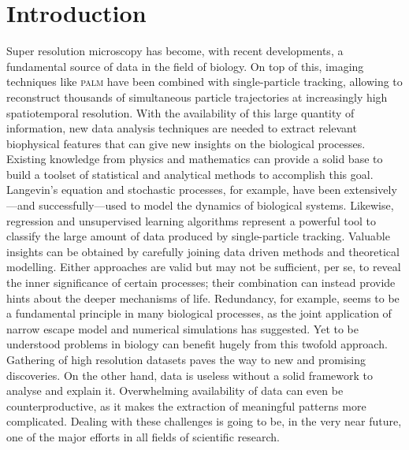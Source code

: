 
\chapter{Introduction}\label{sec:introduction}

Super resolution microscopy has become, with recent developments, a fundamental source of data in the field of biology. On top of this, imaging techniques like \textsc{palm} have been combined with single-particle tracking, allowing to reconstruct thousands of simultaneous particle trajectories at increasingly high spatiotemporal resolution. With the availability of this large quantity of information, new data analysis techniques are needed to extract relevant biophysical features that can give new insights on the biological processes. Existing knowledge from physics and mathematics can provide a solid base to build a toolset of statistical and analytical methods to accomplish this goal. Langevin's equation and stochastic processes, for example, have been extensively---and successfully---used to model the dynamics of biological systems. Likewise, regression and unsupervised learning algorithms represent a powerful tool to classify the large amount of data produced by single-particle tracking. Valuable insights can be obtained by carefully joining data driven methods and theoretical modelling. Either approaches are valid but may not be sufficient, per se, to reveal the inner significance of certain processes; their combination can instead provide hints about the deeper mechanisms of life. Redundancy, for example, seems to be a fundamental principle in many biological processes, as the joint application of narrow escape model and numerical simulations has suggested. Yet to be understood problems in biology can benefit hugely from this twofold approach. Gathering of high resolution datasets paves the way to new and promising discoveries. On the other hand, data is useless without a solid framework to analyse and explain it. Overwhelming availability of data can even be counterproductive, as it makes the extraction of meaningful patterns more complicated. Dealing with these challenges is going to be, in the very near future, one of the major efforts in all fields of scientific research.


